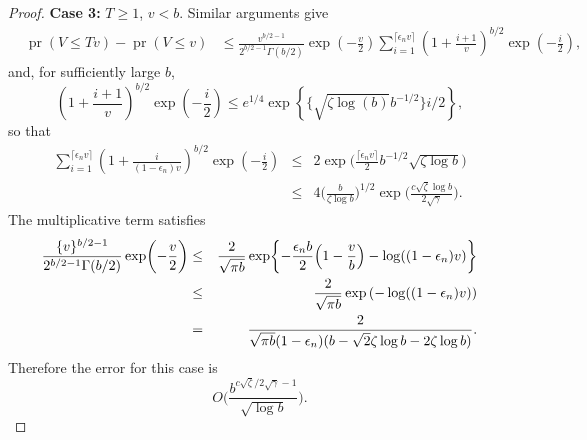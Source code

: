 \documentclass[10pt, reqno]{amsart}
\numberwithin{equation}{section}
\newcommand{\pr}{\mathop{\mathrm{pr}}}
\begin{document}
\begin{appendix}
\begin{proof}
	\noindent \textbf{Case 3:} $T \geq 1$, $v < b$. Similar arguments give
	\begin{align*}
		&\pr\left( V \leq Tv \right) - \pr(V \leq v) 
		&\leq \frac{v^{b/2-1}}{2^{b/2 -1}\Gamma(b/2)} \exp\left( -\frac{ v }{2} \right) \sum^{ \lceil \epsilon_n v \rceil}_{  i = 1}  \left(1+ \frac{i + 1}{v} \right)^{b/2} \exp\left(- \frac{i}{2} \right),
	\end{align*}
	and,  for sufficiently large $b$,
	\[
	\left(1+ \frac{i + 1}{v} \right)^{b/2} \exp\left(- \frac{i}{2} \right) \leq e^{1/4}\exp\left\{  \{\sqrt{\zeta\log(b)}b^{-1/2}\} i/2 \right\},
	\]
	so that
	\begin{eqnarray*}
		\sum^{ \lceil \epsilon_n v \rceil}_{  i = 1}  \left(1+ \frac{i}{(1 -\epsilon_n)v} \right)^{b/2} \exp\left(- \frac{i}{2} \right) &\leq& 2 \exp\biggl(\frac{\lceil \epsilon_n v \rceil}{2}  b^{-1/2}\sqrt{\zeta\log b}  \biggr) \\
		&\leq & 4 \biggl(\frac{b}{\zeta\log b}\biggr)^{1/2} \exp \biggl( \frac{c\sqrt{\zeta} \log b}{2\sqrt{\gamma}} \biggr). 
	\end{eqnarray*}
	The multiplicative term satisfies
	\begin{eqnarray*}
		\frac{\{v\}^{b/2-1}}{2^{b/2 -1}\Gamma(b/2)} \exp\biggl( -\frac{v }{2} \biggr) 
		&\leq &\frac{2}{\sqrt{\pi b}} \exp\biggl\{ -\frac{\epsilon_n b}{2} \Bigl(1 - \frac{v}{b}\Bigr) - \log( (1- \epsilon_n)v )  \biggr\}\\
		&\leq & \frac{2}{\sqrt{\pi b}} \exp\left(  - \log( (1- \epsilon_n)v )  \right) \\
		&=&  \frac{2}{\sqrt{\pi b}(1-\epsilon_n)(b - \sqrt2{\zeta\log b} - 2\zeta\log b) }.
	\end{eqnarray*}
	Therefore the error for this case is
	\[
	O\biggl( \frac{b^{c\sqrt{\zeta}/2\sqrt{\gamma} - 1}}{\sqrt{\log b}} \biggr).
	\]
	

\end{proof}
\end{appendix}
\end{document}

